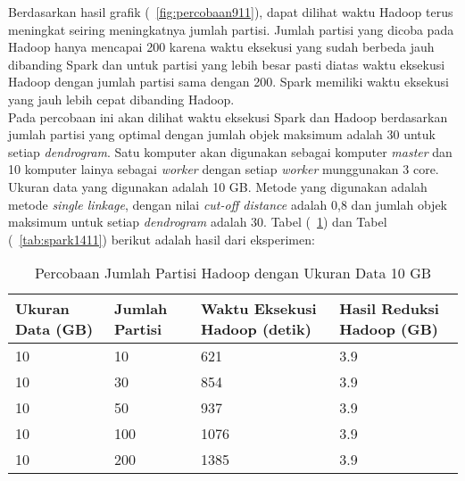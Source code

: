 Berdasarkan hasil grafik (~\ref{fig:percobaan911}), dapat dilihat waktu Hadoop terus meningkat seiring meningkatnya jumlah partisi. Jumlah partisi yang dicoba pada Hadoop hanya mencapai 200 karena waktu eksekusi yang sudah berbeda jauh dibanding Spark dan untuk partisi yang lebih besar pasti diatas waktu eksekusi Hadoop dengan jumlah partisi sama dengan 200. Spark memiliki waktu eksekusi yang jauh lebih cepat dibanding Hadoop.  \\



Pada percobaan ini akan dilihat waktu eksekusi Spark dan Hadoop berdasarkan jumlah partisi yang optimal dengan jumlah objek maksimum adalah 30 untuk setiap \textit{dendrogram}. Satu komputer akan digunakan sebagai komputer \textit{master} dan 10 komputer lainya sebagai \textit{worker} dengan setiap \textit{worker} munggunakan 3 core. Ukuran data yang digunakan adalah 10 GB. Metode yang digunakan adalah metode \textit{single linkage}, dengan nilai \textit{cut-off distance} adalah 0,8 dan jumlah objek maksimum untuk setiap \textit{dendrogram} adalah 30. Tabel (~\ref{tab:spark1311}) dan Tabel (~\ref{tab:spark1411}) berikut adalah hasil dari eksperimen:





\begin{table}[H] 
	\centering 
	\caption{Percobaan Jumlah Partisi Hadoop dengan Ukuran Data 10 GB}
	\label{tab:spark1311}
	\begin{tabular}{|p{3cm}|p{3cm}|p{4cm}|p{4cm}|}
\hline
Ukuran Data (GB) & Jumlah Partisi &  Waktu Eksekusi Hadoop (detik) & Hasil Reduksi Hadoop (GB)\\
\hline
10 & 10 & 621  & 3.9  \\
\hline
10 & 30 & 854  & 3.9  \\
\hline
10 & 50 & 937  & 3.9   \\
\hline
10 & 100 & 1076  & 3.9   \\
\hline
10 & 200 & 1385 & 3.9   \\
\hline


\hline

	\end{tabular} 
\end{table}





